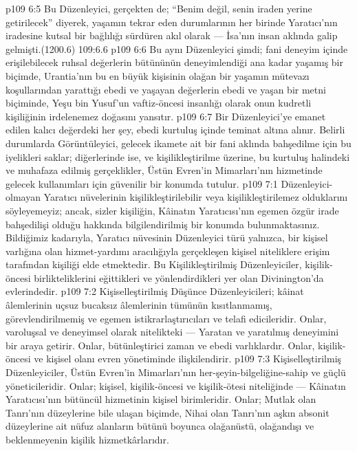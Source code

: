 \vs p109 6:5 Bu Düzenleyici, gerçekten de; “Benim değil, senin iraden yerine getirilecek” diyerek, yaşamın tekrar eden durumlarının her birinde Yaratıcı’nın iradesine kutsal bir bağlılığı sürdüren akıl olarak --- İsa’nın insan aklında galip gelmişti.(1200.6) 109:6.6
\vs p109 6:6 Bu aynı Düzenleyici şimdi; fani deneyim içinde erişilebilecek ruhsal değerlerin bütününün deneyimlendiği ana kadar yaşamış bir biçimde, Urantia’nın bu en büyük kişisinin olağan bir yaşamın mütevazı koşullarından yarattığı ebedi ve yaşayan değerlerin ebedi ve yaşan bir metni biçiminde, Yeşu bin Yusuf’un vaftiz\hyp{}öncesi insanlığı olarak onun kudretli kişiliğinin irdelenemez doğasını yansıtır.
\vs p109 6:7 Bir Düzenleyici’ye emanet edilen kalıcı değerdeki her şey, ebedi kurtuluş içinde teminat altına alınır. Belirli durumlarda Görüntüleyici, gelecek ikamete ait bir fani aklında bahşedilme için bu iyelikleri saklar; diğerlerinde ise, ve kişilikleştirilme üzerine, bu kurtuluş halindeki ve muhafaza edilmiş gerçeklikler, Üstün Evren’in Mimarları’nın hizmetinde gelecek kullanımları için güvenilir bir konumda tutulur.
\vs p109 7:1 Düzenleyici\hyp{}olmayan Yaratıcı nüvelerinin kişilikleştirilebilir veya kişilikleştirilemez olduklarını söyleyemeyiz; ancak, sizler kişiliğin, Kâinatın Yaratıcısı’nın egemen özgür irade bahşedilişi olduğu hakkında bilgilendirilmiş bir konumda bulunmaktasınız. Bildiğimiz kadarıyla, Yaratıcı nüvesinin Düzenleyici türü yalnızca, bir kişisel varlığına olan hizmet\hyp{}yardımı aracılığıyla gerçekleşen kişisel niteliklere erişim tarafından kişiliği elde etmektedir. Bu Kişilikleştirilmiş Düzenleyiciler, kişilik\hyp{}öncesi birlikteliklerini eğittikleri ve yönlendirdikleri yer olan Divinington’da evlerindedir.
\vs p109 7:2 Kişiselleştirilmiş Düşünce Düzenleyicileri; kâinat âlemlerinin uçsuz bucaksız âlemlerinin tümünün kısıtlanmamış, görevlendirilmemiş ve egemen istikrarlaştırıcıları ve telafi edicileridir. Onlar, varoluşsal ve deneyimsel olarak nitelikteki --- Yaratan ve yaratılmış deneyimini bir araya getirir. Onlar, bütünleştirici zaman ve ebedi varlıklardır. Onlar, kişilik\hyp{}öncesi ve kişisel olanı evren yönetiminde ilişkilendirir.
\vs p109 7:3 Kişiselleştirilmiş Düzenleyiciler, Üstün Evren’in Mimarları’nın her\hyp{}şeyin\hyp{}bilgeliğine\hyp{}sahip ve güçlü yöneticileridir. Onlar; kişisel, kişilik\hyp{}öncesi ve kişilik\hyp{}ötesi niteliğinde --- Kâinatın Yaratıcısı’nın bütüncül hizmetinin kişisel birimleridir. Onlar; Mutlak olan Tanrı’nın düzeylerine bile ulaşan biçimde, Nihai olan Tanrı’nın aşkın absonit düzeylerine ait nüfuz alanların bütünü boyunca olağanüstü, olağandışı ve beklenmeyenin kişilik hizmetkârlarıdır.
